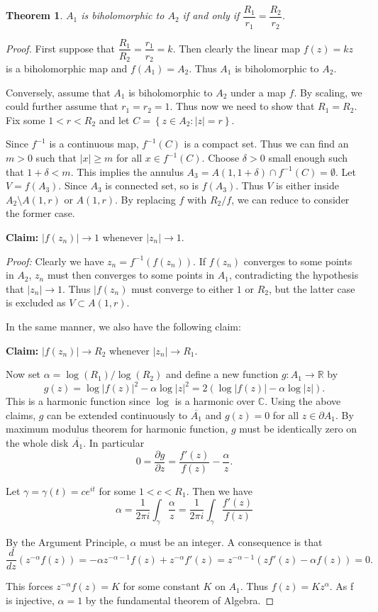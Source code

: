 \documentclass[12pt]{article} %
\newtheorem{theorem}{Theorem}
\begin{document}
\begin{theorem}
  $A_1$ is biholomorphic to $A_2$ if and only if $\dfrac{R_1}{r_1} = \dfrac{R_2}{r_2}$.
\end{theorem}
\begin{proof}
  First suppose that $\dfrac{R_1}{R_2} = \dfrac{r_1}{r_2} =k$. Then clearly the linear map $f(z)=kz$
  is a biholomorphic map and $f(A_1) = A_2$. Thus $A_1$ is biholomorphic to $A_2$.

  Conversely, assume that $A_1$ is biholomorphic to $A_2$ under a map $f$. By scaling, we could further assume that $r_1=r_2=1$. Thus now we need to show that $R_1=R_2$.
  Fix some $1<r<R_2$ and let $C = \left\lbrace z \in A_2 \colon |z|=r\right\rbrace$.

  Since $f^{-1}$ is a continuous map, $f^{-1}(C)$ is a compact set. Thus we can find
  an $m>0$ such that $|x| \ge m$ for all $x \in f^{-1}(C)$. Choose $\delta>0$ small enough
  such that $1+\delta<m$. This implies the annulus $A_3 = A(1,1+\delta) \cap f^{-1}(C)=\emptyset$. Let
  $V = f(A_3)$. Since $A_3$ is connected set, so is $f(A_3)$. Thus $V$ is either inside
  $A_2\setminus A(1,r)$ or $A(1,r)$. By replacing $f$ with $R_2/f$, we can reduce to consider the former case.

  \textbf{Claim:} $|f(z_n)| \to 1$ whenever $|z_n| \to 1$.

  \textit{Proof:} Clearly we have $z_n = f^{-1}(f(z_n))$. If $f(z_n)$ converges to some points
  in $A_2$, $z_n$ must then converges to some points in $A_1$, contradicting the hypothesis that
  $|z_n| \to 1$. Thus $|f(z_n)$ must converge to either $1$ or $R_2$, but the latter case is excluded as $V \subset A(1,r)$.

  In the same manner, we also have the following claim:

  \textbf{Claim:} $|f(z_n)| \to R_2$ whenever $|z_n| \to R_1$.

  Now set $\alpha = \log(R_1)/\log(R_2)$ and define a new function $g \colon A_1 \to \mathbb{R}$ by
  \[g(z) = \log|f(z)|^2 - \alpha\log|z|^2 = 2(\log|f(z)| - \alpha\log|z|).\]
  This is a harmonic function since $\log$ is a harmonic over $\mathbb{C}$. Using the above claims, $g$ can be
  extended continuously to $\overline{A_1}$ and $g(z)=0$ for all $z \in \partial A_1$. By maximum
  modulus theorem for harmonic function, $g$ must be identically zero on the whole disk $\overline{A_1}$.
  In particular
  \[ 0 = \dfrac{\partial g}{\partial z} = \dfrac{f'(z)}{f(z)}-\dfrac{\alpha}{z}.\]

  Let $\gamma = \gamma(t)= ce^{it}$ for some $1<c<R_1$. Then we have
  \[\alpha = \dfrac{1}{2\pi i}\int_{\gamma}\dfrac{\alpha}{z} =\dfrac{1}{2\pi i}\int_{\gamma}\dfrac{f'(z)}{f(z)} \]

  By the Argument Principle, $\alpha$ must be an integer. A consequence is that
  \[\dfrac{d}{dz}(z^{-\alpha}f(z))= -\alpha z^{-\alpha-1}f(z)+z^{-\alpha}f'(z) = z^{-\alpha-1}(zf'(z)-\alpha f(z))=0.\]

  This forces $z^{-\alpha}f(z)=K$ for some constant $K$ on $A_1$. Thus $f(z)=Kz^{\alpha}$. As f is injective, $\alpha=1$ by the fundamental theorem of Algebra.
\end{proof}
\end{document}
